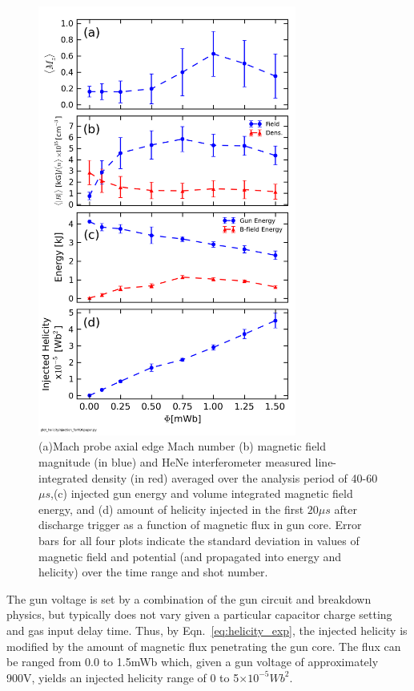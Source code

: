 \documentclass[aps,prl,amsmath,amssymb,reprint,superscriptaddress]{revtex4-1} %
\begin{document}
\begin{figure}[!htbp]
\centerline{
\includegraphics[width=8.5cm]{helicity_scaling.png}}
\caption{\label{fig:helicity_scaling} (a)Mach probe axial edge Mach number (b) magnetic field magnitude (in blue) and HeNe interferometer measured line-integrated density (in red) averaged over the analysis period of 40-60$\mu s$,(c) injected gun energy and volume integrated magnetic field energy, and (d) amount of helicity injected in the first $20 \mu s$ after discharge trigger as a function of magnetic flux in gun core. Error bars for all four plots indicate the standard deviation in values of magnetic field and potential (and propagated into energy and helicity) over the time range and shot number.}
\end{figure}

The gun voltage is set by a combination of the gun circuit and breakdown physics, but typically does not vary given a particular capacitor charge setting and gas input delay time. Thus, by Eqn.~\ref{eq:helicity_exp}, the injected helicity is modified by the amount of magnetic flux penetrating the gun core. The flux can be ranged from 0.0 to 1.5mWb which, given a gun voltage of approximately 900V, yields an injected helicity range of 0 to 5$ \times 10^{-5} Wb^{2}$.
\end{document}
